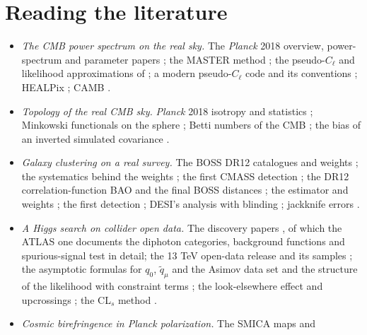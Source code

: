 \section*{Reading the literature}
\label{13d:sec:literature}

\begin{itemize}[itemsep=2pt,leftmargin=1.2em]
  \item \emph{The CMB power spectrum on the real sky.} The \textit{Planck} 2018
        overview, power-spectrum and parameter papers \cite{Planck2018I,Planck2018V,Planck2018VI};
        the MASTER method \cite{Hivon2002}; the pseudo-$C_\ell$ and likelihood
        approximations of \cite{Efstathiou2004,HamimecheLewis2008}; a modern
        pseudo-$C_\ell$ code and its conventions \cite{Alonso2019}; HEALPix
        \cite{Gorski2005}; CAMB \cite{CAMB2000}.
  \item \emph{Topology of the real CMB sky.} \textit{Planck} 2018 isotropy and statistics
        \cite{Planck2018VII}; Minkowski functionals on the sphere
        \cite{SchmalzingGorski1998}; Betti numbers of the CMB \cite{Pranav2017}; the
        bias of an inverted simulated covariance \cite{Hartlap2007}.
  \item \emph{Galaxy clustering on a real survey.} The BOSS DR12 catalogues and weights
        \cite{Reid2016}; the systematics behind the weights \cite{Ross2012}; the
        first CMASS detection \cite{Anderson2012}; the DR12 correlation-function
        BAO \cite{Cuesta2016} and the final BOSS distances \cite{Alam2017}; the
        estimator \cite{LandySzalay1993} and weights \cite{FKP1994}; the first
        detection \cite{Eisenstein2005}; DESI's analysis with blinding
        \cite{DESI2024VI}; jackknife errors \cite{EfronStein1981,Norberg2009}.
  \item \emph{A Higgs search on collider open data.} The discovery papers
        \cite{AadHiggs2012,ChatrchyanHiggs2012}, of which the ATLAS one documents the
        diphoton categories, background functions and spurious-signal test in detail;
        the 13 TeV open-data release and its samples
        \cite{ATLASOpenData2020,SerkinOpenData2020}; the asymptotic formulas for $q_0$,
        $\tilde q_\mu$ and the Asimov data set \cite{Cowan2011} and the structure of the
        likelihood with constraint terms \cite{Cranmer2015}; the look-elsewhere effect
        and upcrossings \cite{GrossVitells2010}; the CL$_s$ method
        \cite{Junk1999,Read2002}.
  \item \emph{Cosmic birefringence in \textit{Planck} polarization.} The SMICA maps and

\end{itemize}
